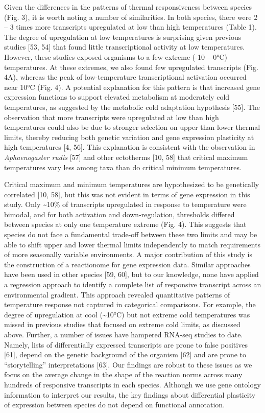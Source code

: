 \documentclass[]{article}
\begin{document}
Given the differences in the patterns of thermal responsiveness between
species (Fig. 3), it is worth noting a number of similarities. In both
species, there were 2 -- 3 times more transcripts upregulated at low
than high temperatures (Table 1). The degree of upregulation at low
temperatures is surprising given previous studies {[}53, 54{]} that
found little transcriptional activity at low temperatures. However,
these studies exposed organisms to a few extreme (-10 -- 0°C)
temperatures. At these extremes, we also found few upregulated
transcripts (Fig. 4A), whereas the peak of low-temperature
transcriptional activation occurred near 10°C (Fig. 4). A potential
explanation for this pattern is that increased gene expression functions
to support elevated metabolism at moderately cold temperatures, as
suggested by the metabolic cold adaptation hypothesis {[}55{]}. The
observation that more transcripts were upregulated at low than high
temperatures could also be due to stronger selection on upper than lower
thermal limits, thereby reducing both genetic variation and gene
expression plasticity at high temperatures {[}4, 56{]}. This explanation
is consistent with the observation in \emph{Aphaenogaster rudis}
{[}57{]} and other ectotherms {[}10, 58{]} that critical maximum
temperatures vary less among taxa than do critical minimum temperatures.

Critical maximum and minimum temperatures are hypothesized to be
genetically correlated {[}10, 58{]}, but this was not evident in terms
of gene expression in this study. Only \textasciitilde{}10\% of
transcripts upregulated in response to temperature were bimodal, and for
both activation and down-regulation, thresholds differed between species
at only one temperature extreme (Fig. 4). This suggests that species do
not face a fundamental trade-off between these two limits and may be
able to shift upper and lower thermal limits independently to match
requirements of more seasonally variable environments. A major
contribution of this study is the construction of a reactionome for gene
expression data. Similar approaches have been used in other species
{[}59, 60{]}, but to our knowledge, none have applied a regression
approach to identify a complete list of responsive transcript across an
environmental gradient. This approach revealed quantitative patterns of
temperature response not captured in categorical comparisons. For
example, the degree of upregulation at cool (\textasciitilde{}10°C) but
not extreme cold temperatures was missed in previous studies that
focused on extreme cold limits, as discussed above. Further, a number of
issues have hampered RNA-seq studies to date. Namely, lists of
differentially expressed transcripts are prone to false positives
{[}61{]}, depend on the genetic background of the organism {[}62{]} and
are prone to ``storytelling'' interpretations {[}63{]}. Our findings are
robust to these issues as we focus on the average change in the shape of
the reaction norms across many hundreds of responsive transcripts in
each species. Although we use gene ontology information to interpret our
results, the key findings about differential plasticity of expression
between species do not depend on functional annotation.
\end{document}
